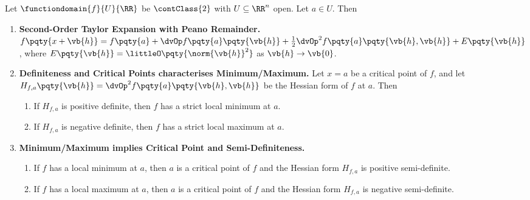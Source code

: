 \begin{theorem}
    Let \(\functiondomain{f}{U}{\RR}\) be \(\contClass{2}\) with \(U \subseteq \RR^n\) open. Let \(a \in U\). Then
    \begin{enumerate}[label=(\alph*)]
        \item \textbf{Second-Order Taylor Expansion with Peano Remainder.} \(f\pqty{x + \vb{h}} = f\pqty{a} + \dvOp f\pqty{a} \pqty{\vb{h}} + \frac{1}{2} \dvOp^2 f\pqty{a}\pqty{\vb{h}, \vb{h}} + E\pqty{\vb{h}}\), where \(E\pqty{\vb{h}} = \littleO\pqty{\norm{\vb{h}}^2}\) as \(\vb{h} \to \vb{0}\).
        \item \textbf{Definiteness and Critical Points characterises Minimum/Maximum.} Let \(x = a\) be a critical point of \(f\), and let \(H_{f, a}\pqty{\vb{h}} = \dvOp^2 f\pqty{a}\pqty{\vb{h}, \vb{h}}\) be the Hessian form of \(f\) at \(a\). Then
        
        \begin{enumerate}[label=(\roman*)]
            \item If \(H_{f, a}\) is positive definite, then \(f\) has a strict local minimum at \(a\).
            \item If \(H_{f, a}\) is negative definite, then \(f\) has a strict local maximum at \(a\).
        \end{enumerate}
        \item \textbf{Minimum/Maximum implies Critical Point and Semi-Definiteness.}
        
        \begin{enumerate}[label=(\roman*)]
            \item If \(f\) has a local minimum at \(a\), then \(a\) is a critical point of \(f\) and the Hessian form \(H_{f, a}\) is positive semi-definite.
            \item If \(f\) has a local maximum at \(a\), then \(a\) is a critical point of \(f\) and the Hessian form \(H_{f, a}\) is negative semi-definite.
        \end{enumerate}
    \end{enumerate}
\end{theorem}

